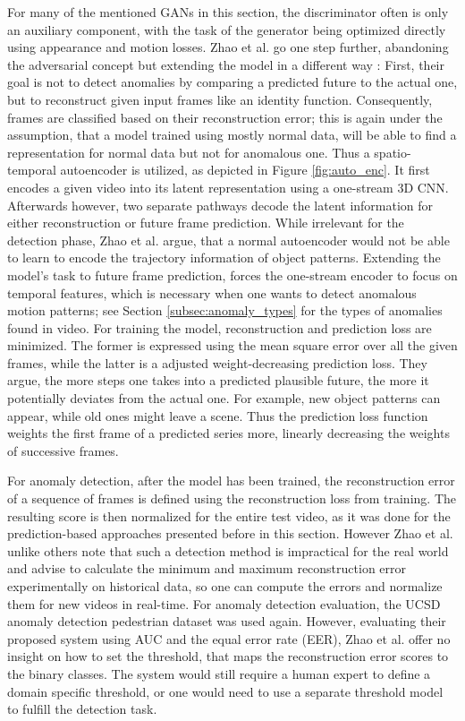 For many of the mentioned GANs in this section, the discriminator often is only an auxiliary component, with the task of the generator being optimized directly using appearance and motion losses. Zhao et al. go one step further, abandoning the adversarial concept but extending the model in a different way \cite{zhao2017spatio}: First, their goal is not to detect anomalies by comparing a predicted future to the actual one, but to reconstruct given input frames like an identity function. Consequently, frames are classified based on their reconstruction error; this is again under the assumption, that a model trained using mostly normal data, will be able to find a representation for normal data but not for anomalous one. Thus a spatio-temporal autoencoder is utilized, as depicted in Figure \ref{fig:auto_enc}. It first encodes a given video into its latent representation using a one-stream 3D CNN. Afterwards however, two separate pathways decode the latent information for either reconstruction or future frame prediction. While irrelevant for the detection phase, Zhao et al. argue, that a normal autoencoder would not be able to learn to encode the trajectory information of object patterns. Extending the model's task to future frame prediction, forces the one-stream encoder to focus on temporal features, which is necessary when one wants to detect anomalous motion patterns; see Section \ref{subsec:anomaly_types} for the types of anomalies found in video. For training the model, reconstruction and prediction loss are minimized. The former is expressed using the mean square error over all the given frames, while the latter is a adjusted weight-decreasing prediction loss. They argue, the more steps one takes into a predicted plausible future, the more it potentially deviates from the actual one. For example, new object patterns can appear, while old ones might leave a scene. Thus the prediction loss function weights the first frame of a predicted series more, linearly decreasing the weights of successive frames.

For anomaly detection, after the model has been trained, the reconstruction error of a sequence of frames is defined using the reconstruction loss from training. The resulting score is then normalized for the entire test video, as it was done for the prediction-based approaches presented before in this section. However Zhao et al. unlike others note that such a detection method is impractical for the real world and advise to calculate the minimum and maximum reconstruction error experimentally on historical data, so one can compute the errors and normalize them for new videos in real-time. For anomaly detection evaluation, the UCSD anomaly detection pedestrian dataset \cite{mahadevan2010anomaly} was used again. However, evaluating their proposed system using AUC and the equal error rate (EER), Zhao et al. offer no insight on how to set the threshold, that maps the reconstruction error scores to the binary classes. The system would still require a human expert to define a domain specific threshold, or one would need to use a separate threshold model to fulfill the detection task.

